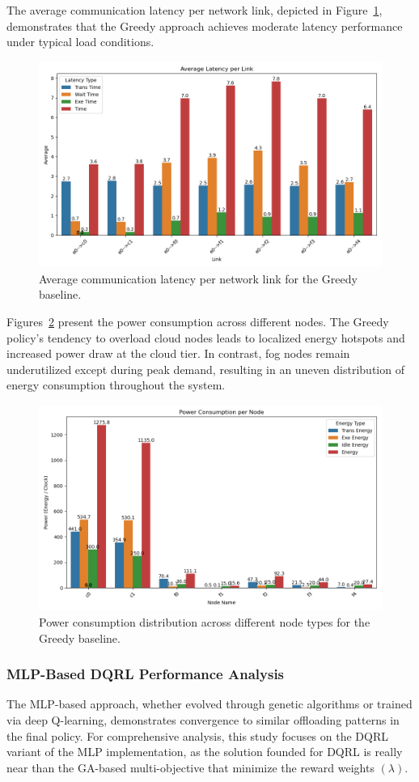 \documentclass[preprint,12pt]{elsarticle}
\begin{document}
The average communication latency per network link, depicted in Figure~\ref{fig:greedy-avg-latency}, demonstrates that the Greedy approach achieves moderate latency performance under typical load conditions. 

\begin{figure}[H]
    \centering
    \includegraphics[width=0.5\linewidth]{figs/greedy_avg_latency_per_link.png}
    \caption{Average communication latency per network link for the Greedy baseline.}
    \label{fig:greedy-avg-latency}
\end{figure}


Figures~\ref{fig:greedy-power-consumption} present the power consumption across different nodes. The Greedy policy's tendency to overload cloud nodes leads to localized energy hotspots and increased power draw at the cloud tier. In contrast, fog nodes remain underutilized except during peak demand, resulting in an uneven distribution of energy consumption throughout the system.

\begin{figure}[H]
    \centering
    \includegraphics[width=0.5\linewidth]{figs/greedy_power_consumption_per_node.png}
    \caption{Power consumption distribution across different node types for the Greedy baseline.}
    \label{fig:greedy-power-consumption}
\end{figure}


\subsubsection{MLP-Based DQRL Performance Analysis}
\label{subsubsec:mlp-dqrl-analysis}

The MLP-based approach, whether evolved through genetic algorithms or trained via deep Q-learning, demonstrates convergence to similar offloading patterns in the final policy. For comprehensive analysis, this study focuses on the DQRL variant of the MLP implementation, as the solution founded for DQRL is really near than the GA-based multi-objective that minimize the reward weights $(\lambda)$.
\end{document}
